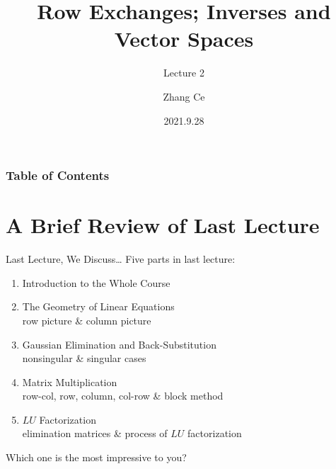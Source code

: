 \documentclass{beamer}
\title[Linear Algebra] %
{Row Exchanges; Inverses and Vector Spaces}
\subtitle{Lecture 2}
\author[11910803@mail.sustech.edu.cn] %
{
    Zhang Ce
}
\institute[] %
{
    Department of Electrical and Electronic Engineering\\
    Southern University of Science and Technology
}
\date[2021.9.28] %
{2021.9.28}
\begin{document}
\frame{\titlepage}


\begin{frame}
\frametitle{Table of Contents}
\tableofcontents
\end{frame}
\section{A Brief Review of Last Lecture}
\begin{frame}{Last Lecture, We Discuss\dots}
Five parts in last lecture:
    \begin{enumerate}
        \item Introduction to the Whole Course
        \item The Geometry of Linear Equations\\
        row picture \& column picture
        \item Gaussian Elimination and Back-Substitution\\
        nonsingular \& singular cases
        \item Matrix Multiplication\\
        row-col, row, column, col-row \& block method
        \item $LU$ Factorization\\
        elimination matrices \& process of $LU$ factorization
    \end{enumerate}

Which one is the most impressive to you?
\end{frame}
\end{document}
